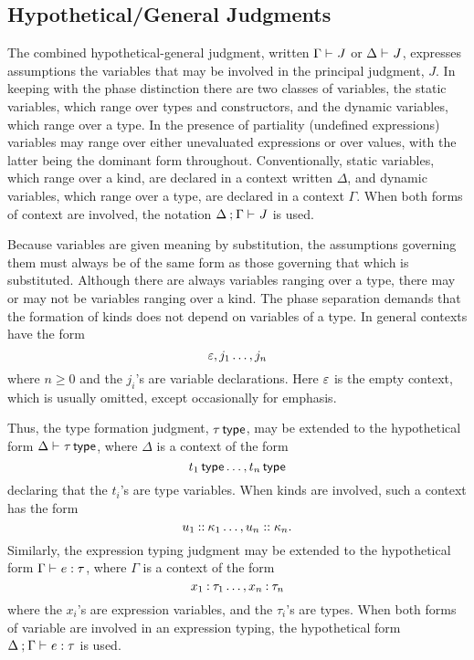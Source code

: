 \documentclass[11pt]{article}
\begin{document}
\subsection*{Hypothetical/General Judgments}

The combined hypothetical-general judgment, written $\Gamma\entailsJ J$ or $\Delta\entailsJ J$, expresses assumptions the variables that may be involved in the principal judgment, $J$.  In keeping with the phase distinction there are two classes of variables, the static variables, which range over types and constructors, and the dynamic variables, which range over a type.  In the presence of partiality (undefined expressions) variables may range over either unevaluated expressions or over values, with the latter being the dominant form throughout.  Conventionally, static variables, which range over a kind, are declared in a context written $\Delta$, and dynamic variables, which range over a type, are declared in a context $\Gamma$.  When both forms of context are involved, the notation $\sepCtx{\Delta}{\Gamma}\entailsJ J$ is used.

Because variables are given meaning by substitution, the assumptions governing them must always be of the same form as those governing that which is substituted.  Although there are always variables ranging over a type, there may or may not be variables ranging over a kind.  The phase separation demands that the formation of kinds does not depend on variables of a type.  In general contexts have the form
\[
    \varepsilon,j_1\dots,j_n
\]
where $n\geq 0$ and the $j_i$'s are variable declarations.  Here $\varepsilon$ is the empty context, which is usually omitted, except occasionally for emphasis.

Thus, the type formation judgment, $\tau\,\textsf{type}$, may be extended to the hypothetical form $\Delta\entailsJ\isTp{\tau}$, where $\Delta$ is a context of the form
\[
    t_1\,\textsf{type}\dots,t_n\,\textsf{type}
\]
declaring that the $t_i$'s are type variables.  When kinds are involved, such a context has the form
\[
    \extCtx{\isOfKd*{u_1}{\kappa_1}\dots}{\isOfKd{u_n}{\kappa_n}}.
\]
Similarly, the expression typing judgment may be extended to the hypothetical form $\Gamma\entailsJ \isOf{e}{\tau}$, where $\Gamma$ is a context of the form
\[
    \extCtx{\isOf*{x_1}{\tau_1}\dots}{\isOf*{x_n}{\tau_n}}
\]
where the $x_i$'s are expression variables, and the $\tau_i$'s are types.  When both forms of variable are involved in an expression typing, the hypothetical form $\sepCtx{\Delta}{\Gamma}\entailsJ \isOf{e}{\tau}$ is used.
\end{document}

